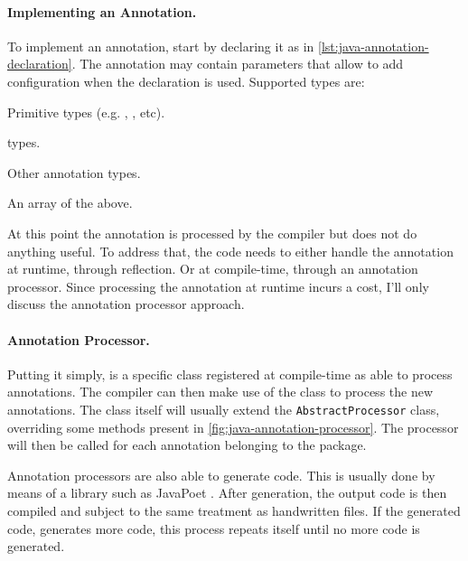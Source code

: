 
\paragraph{Implementing an Annotation.}
To implement an annotation, start by declaring it as in \autoref{lst:java-annotation-declaration}.
The annotation may contain parameters that allow to add configuration when the declaration is used.
Supported types are:
\begin{compactitem}
    \item Primitive types (e.g. , , etc).
    \item {}
    \item {}
    \item {} types.
    \item Other annotation types.
    \item An array of the above.
\end{compactitem}
At this point the annotation is processed by the compiler but does not do anything useful.
To address that, the code needs to either handle the annotation at runtime, through reflection.
Or at compile-time, through an annotation processor.
Since processing the annotation at runtime incurs a cost, I'll only discuss the annotation processor approach.

\paragraph{Annotation Processor.}
Putting it simply, is a specific class registered at compile-time as able to process annotations.
The compiler can then make use of the class to process the new annotations.
The class itself will usually extend the \texttt{AbstractProcessor} class,
overriding some methods present in \autoref{fig:java-annotation-processor}.
The processor will then be called for each annotation belonging to the package.

Annotation processors are also able to generate code.
This is usually done by means of a library such as JavaPoet \autocite{Square2021}.
After generation, the output code is then compiled and subject to the same treatment as handwritten files.
If the generated code, generates more code, this process repeats itself until no more code is generated.

